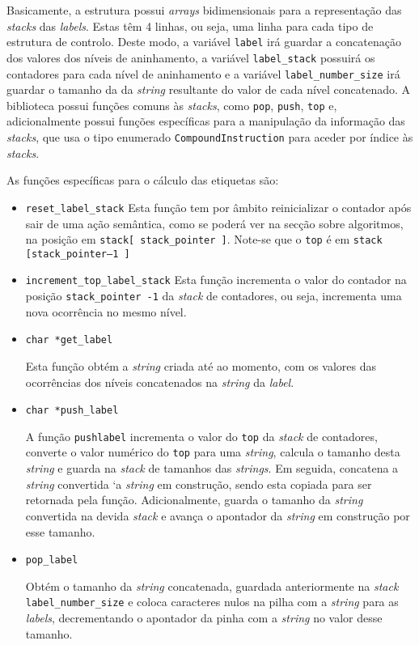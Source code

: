 Basicamente, a estrutura possui \emph{arrays} bidimensionais para
a representação das \emph{stacks} das \emph{labels}. Estas têm 4 linhas, ou
seja, uma linha para cada tipo de estrutura de controlo. Deste modo, a variável
\texttt{label} irá guardar a concatenação dos valores dos níveis de aninhamento,
a variável \texttt{label\_stack} possuirá os contadores para cada nível de
aninhamento e a variável \texttt{label\_number\_size} irá guardar o tamanho da
da \emph{string} resultante do valor de cada nível concatenado. A biblioteca
possui funções comuns às \emph{stacks}, como \texttt{pop}, \texttt{push},
\texttt{top} e, adicionalmente possui funções específicas para a manipulação da
informação das \emph{stacks}, que usa o tipo enumerado
\texttt{CompoundInstruction} para aceder por índice às \emph{stacks}.   

As funções específicas para o cálculo das etiquetas são:

\begin{itemize}
	\item \verb|reset_label_stack|
		Esta função tem por âmbito reinicializar o contador após sair de uma ação 
		semântica, como se poderá ver na secção sobre algoritmos, na posição em 
		\texttt{stack[ stack\_pointer ]}. Note-se que o \texttt{top} é em \texttt{stack
		[stack\_pointer--1 ]} 

  \item \verb|increment_top_label_stack|
		Esta função incrementa o valor do contador na posição \texttt{stack\_pointer
		-1} da \emph{stack} de contadores, ou seja, incrementa uma nova ocorrência
		no mesmo nível.

  \item \verb|char *get_label|              

		Esta função obtém a \emph{string} criada até ao momento, com os valores das
		ocorrências dos níveis concatenados na \emph{string} da \emph{label}.  

  \item \verb|char *push_label|             

		A função \texttt{push\-label} incrementa o valor do \texttt{top} da
		\emph{stack} de contadores,   converte o valor numérico do \texttt{top} para
		uma \emph{string}, calcula o tamanho desta \emph{string} e guarda na
		\emph{stack} de tamanhos das \emph{strings}. Em seguida, concatena
		a \emph{string} convertida `a \emph{string} em construção, sendo esta
		copiada para ser retornada pela função. Adicionalmente, guarda o 
		tamanho da \emph{string} convertida na devida \emph{stack} e avança
		o apontador da \emph{string} em construção por esse tamanho.  

  \item \verb|pop_label|                    

		Obtém o tamanho da \emph{string} concatenada, guardada anteriormente na
		\emph{stack} \texttt{label\_number\_size} e coloca caracteres nulos na pilha
		com a \emph{string} para as \emph{labels}, decrementando o apontador da
		pinha com a \emph{string} no valor desse tamanho. 

\end{itemize}


